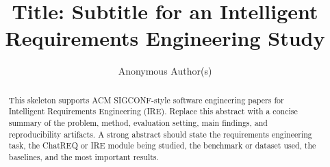 \documentclass[sigconf,review,anonymous]{../../../docs/acmart-primary/acmart}
\begin{document}
\title[IRE Group Paper]{Title: Subtitle for an Intelligent Requirements Engineering Study}

\author{Anonymous Author(s)}

\renewcommand{\shortauthors}{Anonymous et al.}

\begin{abstract}
This skeleton supports ACM SIGCONF-style software engineering papers for Intelligent Requirements Engineering (IRE). Replace this abstract with a concise summary of the problem, method, evaluation setting, main findings, and reproducibility artifacts. A strong abstract should state the requirements engineering task, the ChatREQ or IRE module being studied, the benchmark or dataset used, the baselines, and the most important results.
\end{abstract}



\maketitle












\end{document}

